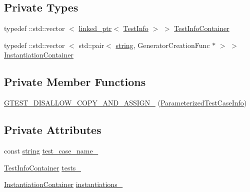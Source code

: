 \subsection*{\-Private \-Types}
\begin{DoxyCompactItemize}
\item 
typedef \-::std\-::vector\*
$<$ \hyperlink{classtesting_1_1internal_1_1linked__ptr}{linked\-\_\-ptr}$<$ \hyperlink{structtesting_1_1internal_1_1ParameterizedTestCaseInfo_1_1TestInfo}{\-Test\-Info} $>$ $>$ \hyperlink{classtesting_1_1internal_1_1ParameterizedTestCaseInfo_a679840bee8825cec04b6c67a75fd7bd2}{\-Test\-Info\-Container}
\item 
typedef \-::std\-::vector\*
$<$ std\-::pair$<$ \hyperlink{namespacetesting_1_1internal_a9882e571372fc19a02d2b2949e1f1557}{string}, \*
\-Generator\-Creation\-Func $\ast$ $>$ $>$ \hyperlink{classtesting_1_1internal_1_1ParameterizedTestCaseInfo_a555ba546b062205df53faaad1561626f}{\-Instantiation\-Container}
\end{DoxyCompactItemize}
\subsection*{\-Private \-Member \-Functions}
\begin{DoxyCompactItemize}
\item 
\hyperlink{classtesting_1_1internal_1_1ParameterizedTestCaseInfo_af567d80d077bec400f7d07c0a204e664}{\-G\-T\-E\-S\-T\-\_\-\-D\-I\-S\-A\-L\-L\-O\-W\-\_\-\-C\-O\-P\-Y\-\_\-\-A\-N\-D\-\_\-\-A\-S\-S\-I\-G\-N\-\_\-} (\hyperlink{classtesting_1_1internal_1_1ParameterizedTestCaseInfo}{\-Parameterized\-Test\-Case\-Info})
\end{DoxyCompactItemize}
\subsection*{\-Private \-Attributes}
\begin{DoxyCompactItemize}
\item 
const \hyperlink{namespacetesting_1_1internal_a9882e571372fc19a02d2b2949e1f1557}{string} \hyperlink{classtesting_1_1internal_1_1ParameterizedTestCaseInfo_a0ff7f4a438a765f6a4354ca1a09ee6bd}{test\-\_\-case\-\_\-name\-\_\-}
\item 
\hyperlink{classtesting_1_1internal_1_1ParameterizedTestCaseInfo_a679840bee8825cec04b6c67a75fd7bd2}{\-Test\-Info\-Container} \hyperlink{classtesting_1_1internal_1_1ParameterizedTestCaseInfo_ae8aa8f4cda99585fe955647d019a1554}{tests\-\_\-}
\item 
\hyperlink{classtesting_1_1internal_1_1ParameterizedTestCaseInfo_a555ba546b062205df53faaad1561626f}{\-Instantiation\-Container} \hyperlink{classtesting_1_1internal_1_1ParameterizedTestCaseInfo_ac0b4d1c590b4ebd74a6a68b89b01042c}{instantiations\-\_\-}
\end{DoxyCompactItemize}



